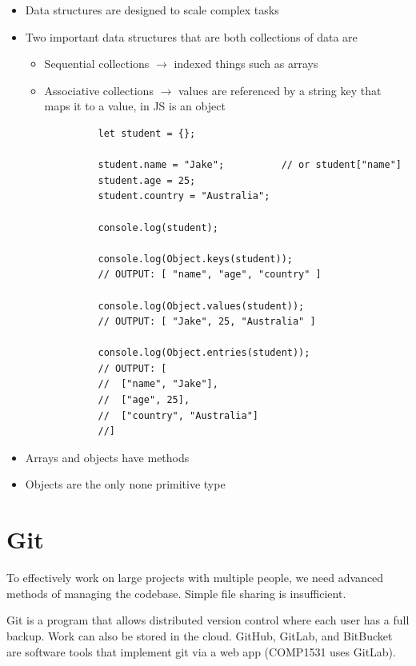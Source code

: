 \documentclass{report}
\begin{document}
			\begin{itemize}
				\item Data structures are designed to scale complex tasks
				\item Two important data structures that are both collections of data are
					\begin{itemize}
						\item Sequential collections $\rightarrow$ indexed things such as arrays
						\item Associative collections $\rightarrow$ values are referenced by a string key that maps it to a value, in JS is an object
					\end{itemize}
			\end{itemize}

			\begin{verbatim}
				let student = {};

				student.name = "Jake";			// or student["name"]
				student.age = 25;
				student.country = "Australia";

				console.log(student);

				console.log(Object.keys(student));
				// OUTPUT: [ "name", "age", "country" ]

				console.log(Object.values(student));
				// OUTPUT: [ "Jake", 25, "Australia" ]

				console.log(Object.entries(student));
				// OUTPUT: [ 
				//	["name", "Jake"], 
				//	["age", 25],
				//	["country", "Australia"]
				//]
			\end{verbatim}

			\begin{itemize}
				\item Arrays and objects have methods
				\item Objects are the only none primitive type
			\end{itemize}

\chapter{Git}

	To effectively work on large projects with multiple people, we need advanced methods of managing the codebase. Simple file sharing is insufficient.

	Git is a program that allows distributed version control where each user has a full backup. Work can also be stored in the cloud. GitHub, GitLab, and BitBucket are software tools that implement git via a web app (COMP1531 uses GitLab). 
\end{document}
